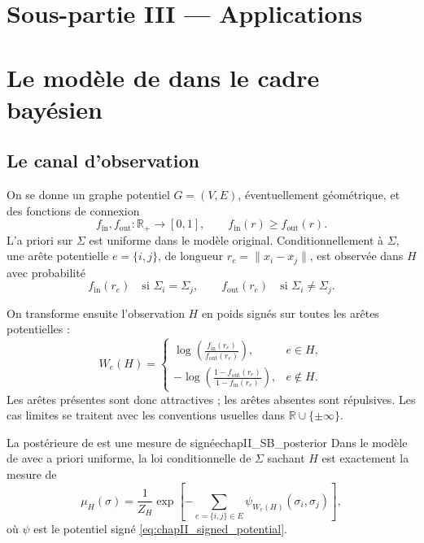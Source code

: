 \section*{Sous-partie III --- Applications}
\label{sec:chapII_partie_applications}

\section{Le modèle de  dans le cadre bayésien}
\label{sec:chapII_SB}

\subsection{Le canal d'observation}

On se donne un graphe potentiel $G=(V,E)$, éventuellement géométrique, et des fonctions de connexion
\[
    f_{\mathrm{in}},f_{\mathrm{out}}:\mathbb R_+\to[0,1],
    \qquad
    f_{\mathrm{in}}(r)\ge f_{\mathrm{out}}(r).
\]
L'a priori sur $\Sigma$ est uniforme dans le modèle original. Conditionnellement à $\Sigma$, une arête potentielle $e=\{i,j\}$, de longueur $r_e=\|x_i-x_j\|$, est observée dans $H$ avec probabilité
\[
    f_{\mathrm{in}}(r_e)\quad\text{si }\Sigma_i=\Sigma_j,
    \qquad
    f_{\mathrm{out}}(r_e)\quad\text{si }\Sigma_i\neq\Sigma_j.
\]

On transforme ensuite l'observation $H$ en poids signés sur toutes les arêtes potentielles :
\begin{equation}
    W_e(H)=
    \begin{cases}
        \displaystyle \log\left(\frac{f_{\mathrm{in}}(r_e)}{f_{\mathrm{out}}(r_e)}\right),& e\in H,\\[2ex]
        \displaystyle -\log\left(\frac{1-f_{\mathrm{out}}(r_e)}{1-f_{\mathrm{in}}(r_e)}\right),& e\notin H.
    \end{cases}
    \label{eq:chapII_SB_weights}
\end{equation}
Les arêtes présentes sont donc attractives ; les arêtes absentes sont répulsives. Les cas limites se traitent avec les conventions usuelles dans $\mathbb R\cup\{\pm\infty\}$.

\begin{Fait}{La postérieure de  est une mesure de  signée}{chapII_SB_posterior}
Dans le modèle de \SB{} avec a priori uniforme, la loi conditionnelle de $\Sigma$ sachant $H$ est exactement la mesure de 
\begin{equation}
    \mu_H(\sigma)
    =
    \frac1{Z_H}
    \exp\left[-\sum_{e=\{i,j\}\in E}\psi_{W_e(H)}(\sigma_i,\sigma_j)\right],
    \label{eq:chapII_SB_gibbs}
\end{equation}
où $\psi$ est le potentiel signé \eqref{eq:chapII_signed_potential}.
\end{Fait}


